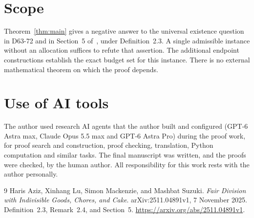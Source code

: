 \documentclass[11pt,a4paper]{article}
\begin{document}
\section{Scope}

Theorem~\ref{thm:main} gives a negative answer to the universal
existence question in D63-72 and in Section~5 of~\cite{ALMS}, under
Definition~2.3. A single admissible instance without an allocation
suffices to refute that assertion. The additional endpoint constructions
establish the exact budget set for this instance. There is no external
mathematical theorem on which the proof depends.

\section*{Use of AI tools}
The author used research AI agents that the author built and configured (GPT-6 Astra max,
Claude Opus 5.5 max and GPT-6 Astra Pro) during the proof work, for proof search and
construction, proof checking, translation, Python computation and similar tasks. The final
manuscript was written, and the proofs were checked, by the human author. All responsibility
for this work rests with the author personally.

\begin{thebibliography}{9}
Haris Aziz, Xinhang Lu, Simon Mackenzie, and Mashbat Suzuki.
\emph{Fair Division with Indivisible Goods, Chores, and Cake}.
arXiv:2511.04891v1, 7 November 2025.
Definition~2.3, Remark~2.4, and Section~5.
\url{https://arxiv.org/abs/2511.04891v1}.
\end{thebibliography}
\end{document}
